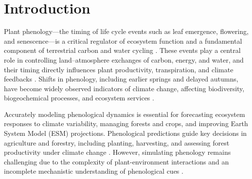 \documentclass[pdflatex,sn-mathphys-num]{sn-jnl}%
\theoremstyle{thmstyleone}%
\theoremstyle{thmstyletwo}%
\theoremstyle{thmstylethree}%
\begin{document}





\maketitle

\section{Introduction}\label{sec1}

Plant phenology—the timing of life cycle events such as leaf emergence, flowering, and senescence—is a critical regulator of ecosystem function and a fundamental component of terrestrial carbon and water cycling \citep{wang_comparison_2022, de_beurs_land_2005}. These events play a central role in controlling land–atmosphere exchanges of carbon, energy, and water, and their timing directly influences plant productivity, transpiration, and climate feedbacks \citep{gray_monitoring_2021, chen_influences_2022}. Shifts in phenology, including earlier springs and delayed autumns, have become widely observed indicators of climate change, affecting biodiversity, biogeochemical processes, and ecosystem services \citep{fu_editorial_2022, yuan_maps_2021}.

Accurately modeling phenological dynamics is essential for forecasting ecosystem responses to climate variability, managing forests and crops, and improving Earth System Model (ESM) projections. Phenological predictions guide key decisions in agriculture and forestry, including planting, harvesting, and assessing forest productivity under climate change \citep{cao_identifying_2021, alberton_relationship_2023}. However, simulating phenology remains challenging due to the complexity of plant-environment interactions and an incomplete mechanistic understanding of phenological cues \citep{liu_modeling_2020, lu_diminishing_2024}.
\end{document}

